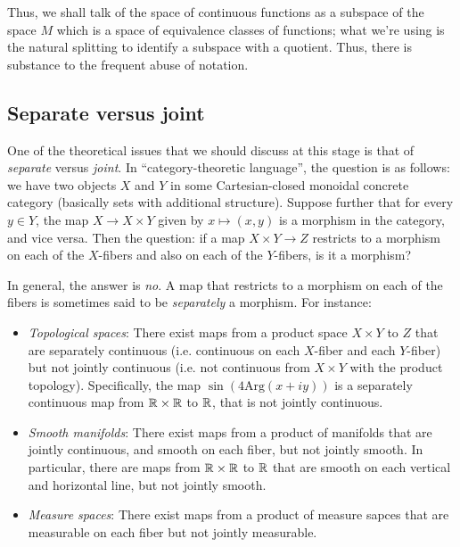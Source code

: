 \documentclass[a4paper]{amsart}
\begin{document}
Thus, we shall talk of the space of continuous functions as a subspace
of the space $M$ which is a space of equivalence classes of
functions; what we're using is the natural splitting to identify a
subspace with a quotient. Thus, there is substance to the frequent
abuse of notation.

\subsection{Separate versus joint}

One of the theoretical issues that we should discuss at this stage is
that of {\em separate} versus {\em joint}. In ``category-theoretic
language'', the question is as follows: we have two objects $X$ and
$Y$ in some Cartesian-closed monoidal concrete category (basically
sets with additional structure). Suppose further that for every $y \in
Y$, the map $X \to X \times Y$ given by $x \mapsto (x,y)$ is a
morphism in the category, and vice versa. Then the question: if a map
$X \times Y \to Z$ restricts to a morphism on each of the $X$-fibers
and also on each of the $Y$-fibers, is it a morphism?

In general, the answer is {\em no}. A map that restricts to a morphism on each of the fibers
is sometimes said to be {\em separately} a morphism. For instance:

\begin{itemize}

\item {\em Topological spaces}: There exist maps from a product space
  $X \times Y$ to $Z$ that are separately continuous (i.e. continuous
  on each $X$-fiber and each $Y$-fiber) but not jointly continuous
  (i.e. not continuous from $X \times Y$ with the product topology).
  Specifically, the map $\sin(4 \text{Arg}(x + iy))$ is a separately
  continuous map from $\mathbb{R} \times \mathbb{R}$ to $\mathbb{R}$, that is not jointly
  continuous.

\item {\em Smooth manifolds}: There exist maps from a product of
  manifolds that are jointly continuous, and smooth on each fiber, but
  not jointly smooth. In particular, there are maps from $\mathbb{R} \times
  \mathbb{R}$ to $\mathbb{R}$ that are smooth on each vertical and horizontal line,
  but not jointly smooth.

\item {\em Measure spaces}: There exist maps from a product of measure
  sapces that are measurable on each fiber but not jointly measurable.

\end{itemize}
\end{document}
